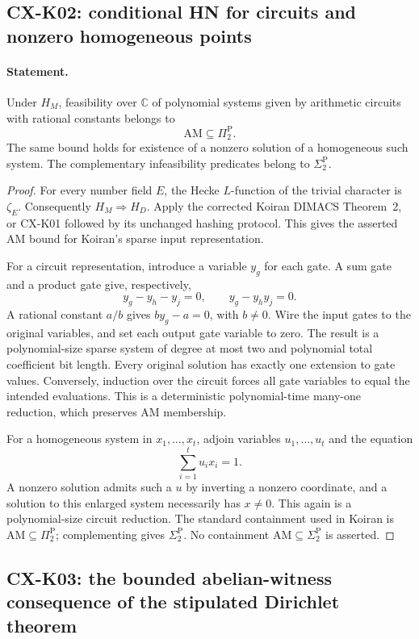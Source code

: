 \subsection{CX-K02: conditional HN for circuits and nonzero homogeneous points}
\label{cx:k02}

\paragraph{Statement.}
Under $H_M$, feasibility over $\mathbb C$ of polynomial systems given
by arithmetic circuits with rational constants belongs to
\[
 \mathrm{AM}\subseteq\Pi_2^{\mathrm P}.
\]
The same bound holds for existence of a nonzero solution of a
homogeneous such system. The complementary infeasibility predicates
belong to $\Sigma_2^{\mathrm P}$.

\begin{proof}
For every number field $E$, the Hecke $L$-function of the trivial
character is $\zeta_E$. Consequently $H_M\Rightarrow H_D$.
Apply the corrected Koiran DIMACS Theorem~2, or CX-K01 followed by its
unchanged hashing protocol. This gives the asserted AM bound for
Koiran's sparse input representation.

For a circuit representation, introduce a variable $y_g$ for each
gate. A sum gate and a product gate give, respectively,
\[
 y_g-y_h-y_j=0,\qquad y_g-y_hy_j=0.
\]
A rational constant $a/b$ gives $by_g-a=0$, with $b\ne0$.
Wire the input gates to the original variables, and set each output
gate variable to zero. The result is a polynomial-size sparse system
of degree at most two and polynomial total coefficient bit length.
Every original solution has exactly one extension to gate values.
Conversely, induction over the circuit forces all gate variables to
equal the intended evaluations. This is a deterministic
polynomial-time many-one reduction, which preserves AM membership.

For a homogeneous system in $x_1,\ldots,x_t$, adjoin variables
$u_1,\ldots,u_t$ and the equation
\[
 \sum_{i=1}^t u_i x_i=1.
\]
A nonzero solution admits such a $u$ by inverting a nonzero coordinate,
and a solution to this enlarged system necessarily has $x\ne0$.
This again is a polynomial-size circuit reduction. The standard
containment used in Koiran is $\mathrm{AM}\subseteq\Pi_2^{\mathrm P}$;
complementing gives $\Sigma_2^{\mathrm P}$. No containment
$\mathrm{AM}\subseteq\Sigma_2^{\mathrm P}$ is asserted.
\end{proof}

\subsection{CX-K03: the bounded abelian-witness consequence of the stipulated Dirichlet theorem}
\label{cx:k03}

